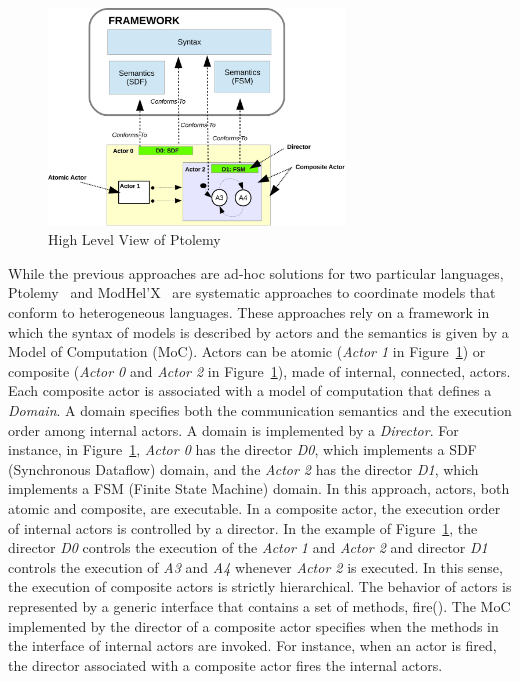 \begin{figure}[ht!]
	\begin{center}
		\includegraphics[width=0.7\textwidth]{background/figs/ptolemyfig}
		\caption{High Level View of Ptolemy~\cite{giraultbib}}
		\label{fig:ptolemyfig}
	\end{center}
\end{figure}

While the previous approaches are ad-hoc solutions for two particular languages, Ptolemy~\cite{ptoleframebib} and ModHel'X~\cite{modhelxbib} are systematic approaches to coordinate models that conform to heterogeneous languages. These approaches rely on a framework in which the syntax of models is described by actors and the semantics is given by a Model of Computation (MoC). Actors can be atomic (\eg \emph{Actor 1} in Figure~\ref{fig:ptolemyfig}) or composite (\eg \emph{Actor 0} and \emph{Actor 2} in Figure~\ref{fig:ptolemyfig}), \ie made of internal, connected, actors. Each composite actor is associated with a model of computation that defines a \emph{Domain}. A domain specifies both the communication semantics and the execution order among internal actors. A domain is implemented by a \emph{Director}. For instance, in Figure~\ref{fig:ptolemyfig}, \emph{Actor 0} has the director \emph{D0}, which implements a SDF (Synchronous Dataflow) domain, and the \emph{Actor 2} has the director \emph{D1}, which implements a FSM (Finite State Machine) domain. In this approach, actors, both atomic and composite, are executable. In a composite actor, the execution order of internal actors is controlled by a director. In the example of Figure~\ref{fig:ptolemyfig}, the director \emph{D0} controls the execution of the \emph{Actor 1} and \emph{Actor 2} and director \emph{D1} controls the execution of \emph{A3} and \emph{A4} whenever \emph{Actor 2} is executed. In this sense, the execution of composite actors is strictly hierarchical. The behavior of actors is represented by a generic interface that contains a set of methods, \eg fire(). The MoC implemented by the director of a composite actor specifies when the methods in the interface of internal actors are invoked. For instance, when an actor is fired, the director associated with a composite actor fires the internal actors. 


